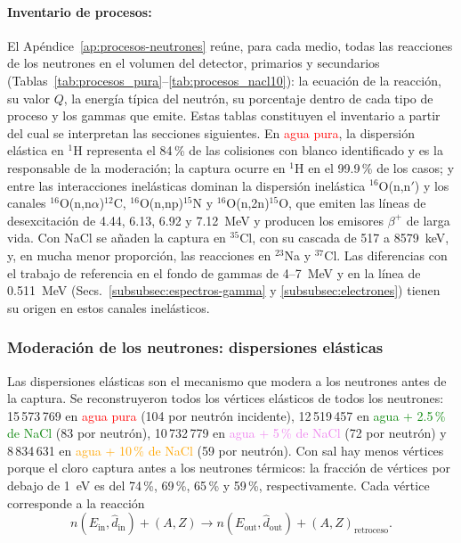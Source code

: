 \paragraph{Inventario de procesos:} El Apéndice~\ref{ap:procesos-neutrones} reúne, para cada medio, todas las reacciones de los neutrones en el volumen del detector, primarios y secundarios (Tablas~\ref{tab:procesos_pura}--\ref{tab:procesos_nacl10}): la ecuación de la reacción, su valor $Q$, la energía típica del neutrón, su porcentaje dentro de cada tipo de proceso y los gammas que emite. Estas tablas constituyen el inventario a partir del cual se interpretan las secciones siguientes. En \textcolor{red}{agua pura}, la dispersión elástica en $^{1}$H representa el 84\,\% de las colisiones con blanco identificado y es la responsable de la moderación; la captura ocurre en $^{1}$H en el 99.9\,\% de los casos; y entre las interacciones inelásticas dominan la dispersión inelástica $^{16}$O(n,n$'$) y los canales $^{16}$O(n,n$\alpha$)$^{12}$C, $^{16}$O(n,np)$^{15}$N y $^{16}$O(n,2n)$^{15}$O, que emiten las líneas de desexcitación de 4.44, 6.13, 6.92 y 7.12~MeV y producen los emisores $\beta^{+}$ de larga vida. Con NaCl se añaden la captura en $^{35}$Cl, con su cascada de 517 a 8579~keV, y, en mucha menor proporción, las reacciones en $^{23}$Na y $^{37}$Cl. Las diferencias con el trabajo de referencia en el fondo de gammas de 4--7~MeV y en la línea de 0.511~MeV (Secs.~\ref{subsubsec:espectros-gamma} y \ref{subsubsec:electrones}) tienen su origen en estos canales inelásticos.

\subsubsection{Moderación de los neutrones: dispersiones elásticas}
\label{subsubsec:elasticas}

Las dispersiones elásticas son el mecanismo que modera a los neutrones antes de la captura. Se reconstruyeron todos los vértices elásticos de todos los neutrones: 15\,573\,769 en \textcolor{red}{agua pura} (104 por neutrón incidente), 12\,519\,457 en \textcolor{green}{agua + 2.5\,\% de NaCl} (83 por neutrón), 10\,732\,779 en \textcolor{violet}{agua + 5\,\% de NaCl} (72 por neutrón) y 8\,834\,631 en \textcolor{orange}{agua + 10\,\% de NaCl} (59 por neutrón). Con sal hay menos vértices porque el cloro captura antes a los neutrones térmicos: la fracción de vértices por debajo de 1~eV es del 74\,\%, 69\,\%, 65\,\% y 59\,\%, respectivamente. Cada vértice corresponde a la reacción
\begin{equation}
	n(E_{\mathrm{in}},\hat{d}_{\mathrm{in}}) + (A,Z) \longrightarrow n(E_{\mathrm{out}},\hat{d}_{\mathrm{out}}) + (A,Z)_{\mathrm{retroceso}} .
\end{equation}

